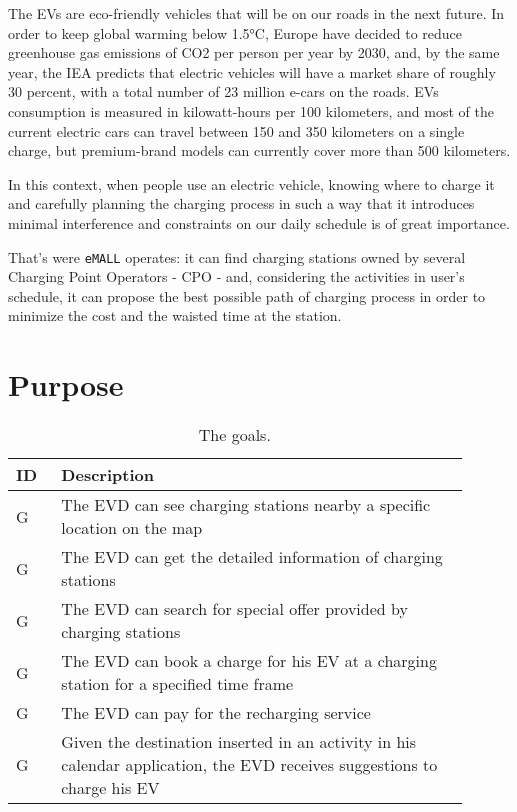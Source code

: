 The EVs are eco-friendly vehicles that will be on our roads in the next future.
In order to keep global warming below 1.5°C, Europe have decided to reduce greenhouse gas emissions of CO2 per
person per year by 2030, and, by the same year, the IEA predicts that electric vehicles will have a market share
of roughly 30 percent, with a total number of 23 million e-cars on the roads.
EVs consumption is measured in kilowatt-hours per 100 kilometers, and most of the current electric cars can travel
between 150 and 350 kilometers on a single charge, but premium-brand models can currently cover more than 500
kilometers.

In this context, when people use an electric vehicle, knowing where to charge it and carefully planning the
charging process in such a way that it introduces minimal interference and constraints on our daily schedule
is of great importance.

That's were \verb|eMALL| operates: it can find charging stations owned by several Charging Point Operators - CPO - and,
considering the activities in user's schedule, it can propose the best possible path of charging process
in order to minimize the cost and the waisted time at the station.


\section{Purpose}
\label{sec:purpose}
\setcounter{g}{1}
\newcommand{\cg}{\theg\stepcounter{g}}
\begin{table}[H]
    \centering
    \begin{tabular}{ |l|p{0.9\linewidth}| }
        \hline
        \textbf{ID} & \textbf{Description}                                                                                                     \\
        \hline
        G\cg        & The EVD can see charging stations nearby a specific location on the map                                                  \\
        \hline
        G\cg        & The EVD can get the detailed information of charging stations                                                            \\
        \hline
        G\cg        & The EVD can search for special offer provided by charging stations                                                       \\
        \hline
        G\cg        & The EVD can book a charge for his EV at a charging station for a specified time frame                                    \\
        \hline
        G\cg        & The EVD can pay for the recharging service                                                                               \\
        \hline
        G\cg        & Given the destination inserted in an activity in his calendar application, the EVD receives suggestions to charge his EV \\ %
        \hline
    \end{tabular}
    \caption{The goals.}
    \label{tab:goals_tab}
\end{table}


